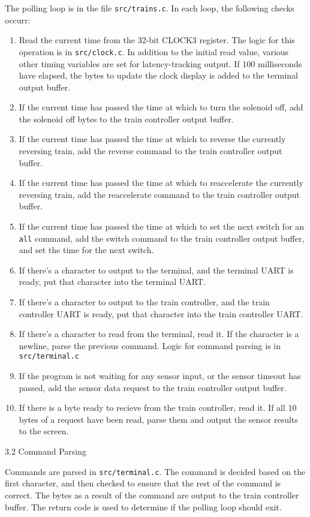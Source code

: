 \documentclass{article}
\begin{document}
The polling loop is in the file \verb|src/trains.c|. In each loop, the following checks occurr:
\begin{enumerate}
\item Read the current time from the 32-bit CLOCK3 register. The logic for this operation is in \verb|src/clock.c|. In addition to the initial read value, various other timing variables are set for latency-tracking output. If 100 milliseconds have elapsed, the bytes to update the clock display is added to the terminal output buffer.
\item If the current time has passed the time at which to turn the solenoid off, add the solenoid off bytes to the train controller output buffer.
\item If the current time has passed the time at which to reverse the currently reversing train, add the reverse command to the train controller output buffer.
\item If the current time has passed the time at which to reaccelerate the currently reversing train, add the reaccelerate command to the train controller output buffer.
\item If the current time has passed the time at which to set the next switch for an \verb|all| command, add the switch command to the train controller output buffer, and set the time for the next switch.
\item If there's a character to output to the terminal, and the terminal UART is ready, put that character into the terminal UART.
\item If there's a character to output to the train controller, and the train controller UART is ready, put that character into the train controller UART.
\item If there's a character to read from the terminal, read it. If the character is a newline, parse the previous command. Logic for command parsing is in \verb|src/terminal.c|
\item If the program is not waiting for any sensor input, or the sensor timeout has passed, add the sensor data request to the train controller output buffer.
\item If there is a byte ready to recieve from the train controller, read it. If all 10 bytes of a request have been read, parse them and output the sensor results to the screen.

\end{enumerate}
{\large 3.2 Command Parsing}

Commands are parsed in \verb|src/terminal.c|. The command is decided based on the first character, and then checked to ensure that the rest of the command is correct. The bytes as a result of the command are output to the train controller buffer. The return code is used to determine if the polling loop should exit.
\end{document}
